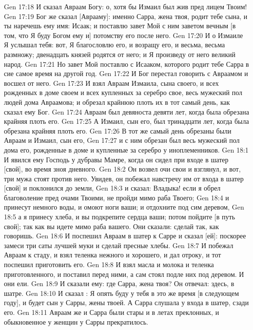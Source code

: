 \vs Gen 17:18 И сказал Авраам Богу: о, хотя бы Измаил был жив пред лицем Твоим!
\vs Gen 17:19 Бог же сказал [Аврааму]: именно Сарра, жена твоя, родит тебе сына, и ты наречешь ему имя: Исаак; и поставлю завет Мой с ним заветом вечным [в том, что Я буду Богом ему и] потомству его после него.
\vs Gen 17:20 И о Измаиле Я услышал тебя: вот, Я благословлю его, и возращу его, и весьма, весьма размножу; двенадцать князей родятся от него; и Я произведу от него великий народ.
\vs Gen 17:21 Но завет Мой поставлю с Исааком, которого родит тебе Сарра в сие самое время на другой год.
\vs Gen 17:22 И Бог перестал говорить с Авраамом и восшел от него.
\rsbpar\vs Gen 17:23 И взял Авраам Измаила, сына своего, и всех рожденных в доме своем и всех купленных за серебро свое, весь мужеский пол людей дома Авраамова; и обрезал крайнюю плоть их в тот самый день, как сказал ему Бог.
\vs Gen 17:24 Авраам был девяноста девяти лет, когда была обрезана крайняя плоть его.
\vs Gen 17:25 А Измаил, сын его, был тринадцати лет, когда была обрезана крайняя плоть его.
\vs Gen 17:26 В тот же самый день обрезаны были Авраам и Измаил, сын его,
\vs Gen 17:27 и с ним обрезан был весь мужеский пол дома его, рожденные в доме и купленные за серебро у иноплеменников.
\vs Gen 18:1 И явился ему Господь у дубравы Мамре, когда он сидел при входе в шатер [свой], во время зноя дневного.
\vs Gen 18:2 Он возвел очи свои и взглянул, и вот, три мужа стоят против него. Увидев, он побежал навстречу им от входа в шатер [свой] и поклонился до земли,
\vs Gen 18:3 и сказал: Владыка! если я обрел благоволение пред очами Твоими, не пройди мимо раба Твоего;
\vs Gen 18:4 и принесут немного воды, и омоют ноги ваши; и отдохните под сим деревом,
\vs Gen 18:5 а я принесу хлеба, и вы подкрепите сердца ваши; потом пойдите [в путь свой]; так как вы идете мимо раба вашего. Они сказали: сделай так, как говоришь.
\vs Gen 18:6 И поспешил Авраам в шатер к Сарре и сказал [ей]: поскорее замеси три саты лучшей муки и сделай пресные хлебы.
\vs Gen 18:7 И побежал Авраам к стаду, и взял теленка нежного и хорошего, и дал отроку, и тот поспешил приготовить его.
\vs Gen 18:8 И взял масла и молока и теленка приготовленного, и поставил перед ними, а сам стоял подле них под деревом. И они ели.
\vs Gen 18:9 И сказали ему: где Сарра, жена твоя? Он отвечал: здесь, в шатре.
\vs Gen 18:10 И сказал : Я опять буду у тебя в это же время [в следующем году], и будет сын у Сарры, жены твоей. А Сарра слушала у входа в шатер, сзади его.
\vs Gen 18:11 Авраам же и Сарра были стары и в летах преклонных, и обыкновенное у женщин у Сарры прекратилось.

